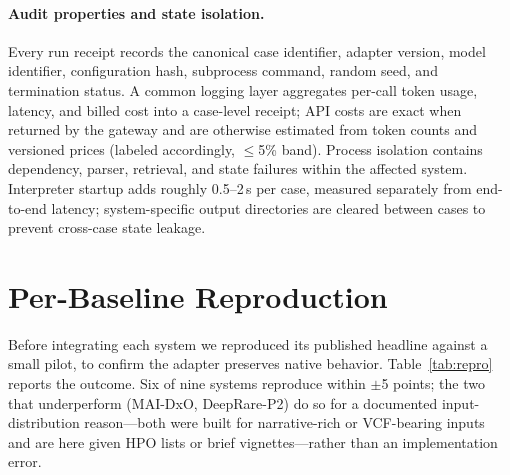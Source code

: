 \documentclass[letterpaper]{article} %
\begin{document}
\paragraph{Audit properties and state isolation.}
Every run receipt records the canonical case identifier, adapter version, model
identifier, configuration hash, subprocess command, random seed, and
termination status. A common logging layer aggregates per-call token usage,
latency, and billed cost into a case-level receipt; API costs are exact when
returned by the gateway and are otherwise estimated from token counts and
versioned prices (labeled accordingly, $\leq$5\% band). Process isolation
contains dependency, parser, retrieval, and state failures within the affected
system. Interpreter startup adds roughly 0.5--2\,s per case, measured separately
from end-to-end latency; system-specific output directories are cleared between
cases to prevent cross-case state leakage.

\section{Per-Baseline Reproduction}
\label{app:repro}

Before integrating each system we reproduced its published headline against a
small pilot, to confirm the adapter preserves native behavior.
Table~\ref{tab:repro} reports the outcome. Six of nine systems reproduce within
$\pm$5 points; the two that underperform (MAI-DxO, DeepRare-P2) do so for a
documented input-distribution reason---both were built for narrative-rich or
VCF-bearing inputs and are here given HPO lists or brief vignettes---rather than
an implementation error.
\end{document}
